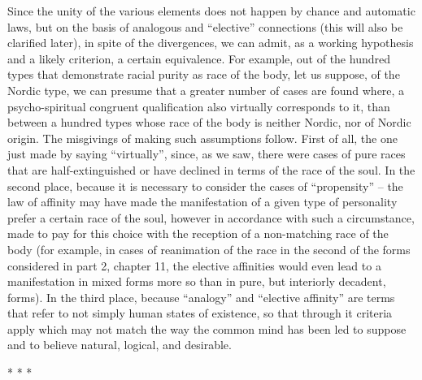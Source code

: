 Since the unity of the various elements does not happen by chance and automatic laws, but on the basis of analogous and ``elective'' connections (this will also be clarified later), in spite of the divergences, we can admit, as a working hypothesis and a likely criterion, a certain equivalence. For example, out of the hundred types that demonstrate racial purity as race of the body, let us suppose, of the Nordic type, we can presume that a greater number of cases are found where, a psycho-spiritual congruent qualification also virtually corresponds to it, than between a hundred types whose race of the body is neither Nordic, nor of Nordic origin. The misgivings of making such assumptions follow. First of all, the one just made by saying ``virtually'', since, as we saw, there were cases of pure races that are half-extinguished or have declined in terms of the race of the soul. In the second place, because it is necessary to consider the cases of ``propensity'' -- the law of affinity may have made the manifestation of a given type of personality prefer a certain race of the soul, however in accordance with such a circumstance, made to pay for this choice with the reception of a non-matching race of the body (for example, in cases of reanimation of the race in the second of the forms considered in part 2, chapter 11, the elective affinities would even lead to a manifestation in mixed forms more so than in pure, but interiorly decadent, forms). In the third place, because ``analogy'' and ``elective affinity'' are terms that refer to not simply human states of existence, so that through it criteria apply which may not match the way the common mind has been led to suppose and to believe natural, logical, and desirable.



\begin{center}* * *\end{center}

